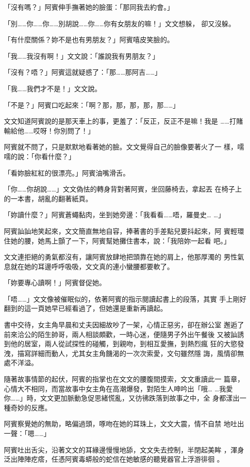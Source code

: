 「沒有嗎？」阿賓伸手撫著她的臉蛋：「那同我去約會。」

「別……你……你……別胡說……你……你有女朋友的嘛！」文文想躲，
卻又沒躲。

「有什麼關係？妳不是也有男朋友？」阿賓嘻皮笑臉的。

「我……我沒有啊！」文文說：「誰說我有男朋友？」

「沒有？唔？」阿賓這就疑惑了：「那……那阿吉……」

「我……我們才不是！」文文說。

「不是？」阿賓口吃起來：「啊？那，那，那，那，那……」

文文知道阿賓說的是那天車上的事，更羞了：「反正，反正不是嘛！我是
……打賭輸給他……哎呀！你別問了！」

阿賓就不問了，只是默默地看著她的臉。文文覺得自己的臉像要著火了一
樣，嚅嚅的說：「你看什麼？」

「看妳臉紅紅的很漂亮。」阿賓油嘴滑舌。

「你……你胡說……」文文偽怯的轉身背對著阿賓，坐回藤椅去，拿起丟
在椅子上的一本書，胡亂的翻著紙頁。

「妳讀什麼？」阿賓蒼蠅黏肉，坐到她旁邊：「我看看……唔，羅曼史…
…」

阿賓訕訕地笑起來，文文簡直無地自容，捧著書的手差點兒要抖起來，阿
賓輕環住她的腰，她馬上顫了一下，阿賓幫她攤住書本，說：「我陪妳一起看
吧。」

文文連拒絕的勇氣都沒有，讓阿賓放肆地把頭靠在她的肩上，他那厚濁的
男性氣息就在她的耳邊呼呼吸吸，文文真的連小蠻腰都要軟了。

「妳要專心讀啊！」阿賓督促她。

「唔……」文文像被催眠似的，依著阿賓的指示閱讀起書上的段落，其實
手上剛好翻到的這一頁她早已經看過了，但她還是重新再讀起。

書中交待，女主角早晨和丈夫因細故吵了一架，心情正惡劣，卻在辦公室
邂逅了前來洽公的陌生帥哥，兩人相談頗歡，一時心迷，便隨男子外出午餐後
又被訕誘到他的居室，兩人從試探性的碰觸，到親吻，到相互愛撫，到熱烈瘋
狂的大慾發洩，描寫詳細而動人，尤其女主角饑渴的一次次索愛，文句雖然隱
誨，風情卻無處不洋溢。

隨著故事情節的起伏，阿賓的指掌也在文文的腰腹間摸索，文文重讀此一
篇章，心情大不相同，而當故事中女主角在高潮爆發，對陌生人呻吟出「哦…
…我愛你……」時，文文更加脈動急促思緒慌亂，又彷彿跌落到故事之中，全
身都漾出一種奇妙的反應。

阿賓察覺她的無助，略偏過頭，啄吻在她的耳珠上，文文大震，情不自禁
地吐出一聲：「嗯……」

阿賓吐出舌尖，沿著文文的耳緣邊慢慢地舔，文文失去控制，半閉起美眸
，渾身泛出陣陣疙瘩，任憑阿賓毒蟒般的蛇信在她敏感的聽覺器官上浮游徘徊
。

